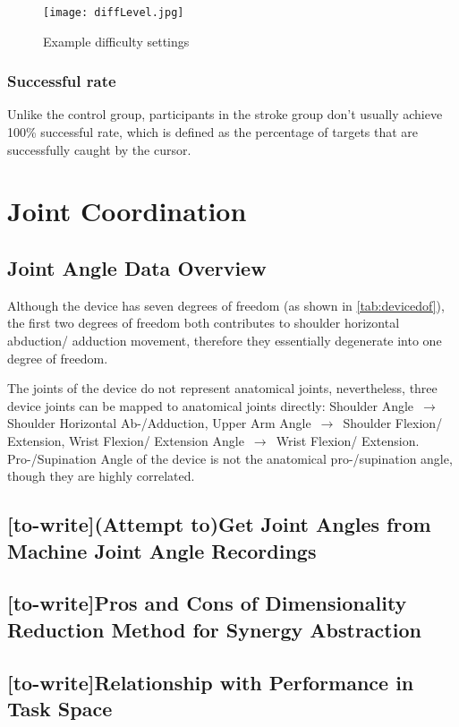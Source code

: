 \begin{figure}
	\texttt{[image: diffLevel.jpg]}
	\centering
	\caption{Example difficulty settings}
	\medskip
	\small 
	\label{fig:diffLevel}
\end{figure}

\subsubsection{Successful rate}

Unlike the control group, participants in the stroke group don't usually achieve 100\% successful rate, which is defined as the percentage of targets that are successfully caught by the cursor. 


\section{Joint Coordination}

\subsection{Joint Angle Data Overview}
Although the device has seven degrees of freedom (as shown in \ref{tab:devicedof}), the first two degrees of freedom both contributes to shoulder horizontal abduction/ adduction movement, therefore they essentially degenerate into one degree of freedom.

The joints of the device do not represent anatomical joints, nevertheless, three device joints can be mapped to anatomical joints directly: Shoulder Angle $\,\to\,$ Shoulder Horizontal Ab-/Adduction, Upper Arm Angle $\,\to\,$ Shoulder Flexion/ Extension, Wrist Flexion/ Extension Angle $\,\to\,$ Wrist Flexion/ Extension. Pro-/Supination Angle of the device is not the anatomical pro-/supination angle, though they are highly correlated.


\subsection{[to-write](Attempt to)Get Joint Angles from Machine Joint Angle Recordings }
\subsection{[to-write]Pros and Cons of Dimensionality Reduction Method for Synergy Abstraction}
\subsection{[to-write]Relationship with Performance in Task Space}
